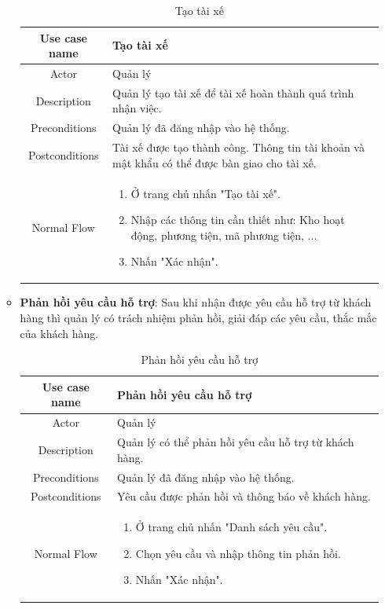 \begin{itemize}
\begin{itemize}
			\begin{table}[H]
				\centering\begin{tabular}{|c|m{25em}|}
					\hline 
					Use case name & Tạo tài xế\\ 
					\hline 
					Actor & Quản lý \\ 
					\hline
					Description & Quản lý tạo tài xế để tài xế hoàn thành quá trình nhận việc. \\
					\hline 
					Preconditions & Quản lý đã đăng nhập vào hệ thống. \\
					\hline
					Postconditions & Tài xế được tạo thành công. Thông tin tài khoản và mật khẩu có thể được bàn giao cho tài xế. \\
					\hline
					Normal Flow & \begin{enumerate}
						\item Ở trang chủ nhấn "Tạo tài xế".
						\item Nhập các thông tin cần thiết như: Kho hoạt động, phương tiện, mã phương tiện, ...
						\item Nhấn "Xác nhận".
					\end{enumerate}
					\\
					\hline
				\end{tabular}
				\caption{Tạo tài xế}
			\end{table}
		
			\item \textbf{Phản hồi yêu cầu hỗ trợ}: Sau khi nhận được yêu cầu hỗ trợ từ khách hàng thì quản lý có trách nhiệm phản hồi, giải đáp các yêu cầu, thắc mắc của khách hàng.
			
			\begin{table}[H]
				\centering\begin{tabular}{|c|m{25em}|}
					\hline 
					Use case name & Phản hồi yêu cầu hỗ trợ\\ 
					\hline 
					Actor & Quản lý \\ 
					\hline
					Description & Quản lý có thể phản hồi yêu cầu hỗ trợ từ khách hàng. \\
					\hline 
					Preconditions & Quản lý đã đăng nhập vào hệ thống. \\
					\hline
					Postconditions & Yêu cầu được phản hồi và thông báo về khách hàng. \\
					\hline
					Normal Flow & \begin{enumerate}
						\item Ở trang chủ nhấn "Danh sách yêu cầu".
						\item Chọn yêu cầu và nhập thông tin phản hồi.
						\item Nhấn "Xác nhận".
					\end{enumerate}
					\\
					\hline
				\end{tabular}
				\caption{Phản hồi yêu cầu hỗ trợ}
			\end{table}
		

\end{itemize}
\end{itemize}
